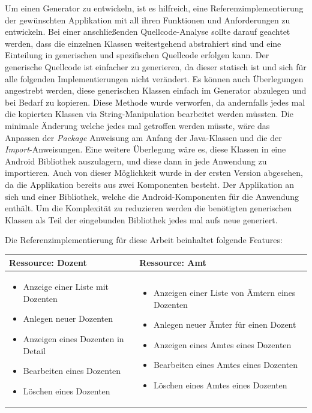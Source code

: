 Um einen Generator zu entwickeln, ist es hilfreich, eine Referenzimplementierung der gewünschten Applikation mit all ihren Funktionen und Anforderungen zu entwickeln. Bei einer anschließenden Quellcode-Analyse sollte darauf geachtet werden, dass die einzelnen Klassen weitestgehend abstrahiert sind und eine Einteilung in generischen und spezifischen Quellcode erfolgen kann. Der generische Quellcode ist einfacher zu generieren, da dieser statisch ist und sich für alle folgenden Implementierungen nicht verändert. Es können auch Überlegungen angestrebt werden, diese generischen Klassen einfach im Generator abzulegen und bei Bedarf zu kopieren. Diese Methode wurde verworfen, da andernfalls jedes mal die kopierten Klassen via String-Manipulation bearbeitet werden müssten. Die minimale Änderung welche jedes mal getroffen werden müsste, wäre das Anpassen der \textit{Package} Anweisung am Anfang der Java-Klassen und die der \textit{Import}-Anweisungen. Eine weitere Überlegung wäre es, diese Klassen in eine Android Bibliothek auszulagern, und diese dann in jede Anwendung zu importieren. Auch von dieser Möglichkeit wurde in der ersten Version abgesehen, da die Applikation bereits aus zwei Komponenten besteht. Der Applikation an sich und einer Bibliothek, welche die Android-Komponenten für die Anwendung enthält. Um die Komplexität zu reduzieren werden die benötigten generischen Klassen als Teil der eingebunden Bibliothek jedes mal aufs neue generiert.

Die Referenzimplementierung für diese Arbeit beinhaltet folgende Features:
\begin{center}
	\begin{tabular}{p{}|p{}}
		\textbf{Ressource: Dozent} & \textbf{Ressource: Amt} \\ \hline
		\begin{itemize}
			\item Anzeige einer Liste mit Dozenten
			\item Anlegen neuer Dozenten
			\item Anzeigen eines Dozenten in Detail
			\item Bearbeiten eines Dozenten
			\item Löschen eines Dozenten
		\end{itemize}
		&
		\begin{itemize}
			\item Anzeigen einer Liste von Ämtern eines Dozenten
			\item Anlegen neuer Ämter für einen Dozent
			\item Anzeigen eines Amtes eines Dozenten
			\item Bearbeiten eines Amtes eines Dozenten
			\item Löschen eines Amtes eines Dozenten
		\end{itemize}
		\\
	\end{tabular}
\end{center}

